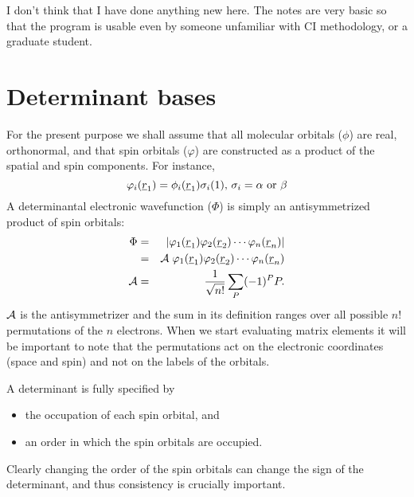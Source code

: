 I don't think that I have done anything new here.  The notes are very
basic so that the program is usable even by someone unfamiliar with CI
methodology, or a graduate student.

\section{Determinant bases}

 For the present purpose we shall assume that all molecular orbitals
($\phi$) are real, orthonormal, and that spin orbitals ($\varphi$) are
constructed as a product of the spatial and spin components.  For
instance,
\begin{equation}
 \varphi_{i}(\underline{r}_{1}) = \phi_i(\underline{r}_{1}) \sigma_i(1)
\mbox{, $\sigma_i = \alpha$ or $\beta$}
\end{equation}
A determinantal electronic wavefunction ($\Phi$) is simply an
antisymmetrized product of spin orbitals:
\begin{eqnarray}
  \Phi & = & \left| \varphi_{1}(\underline{r}_{1}) \varphi_{2}(\underline{r}_{2}) \cdots
\varphi_{n}(\underline{r}_{n}) \right | \\
       & = & {\cal A} \; \varphi_{1}(\underline{r}_{1}) \varphi_{2}(\underline{r}_{2}) \cdots
\varphi_{n}(\underline{r}_{n}) \\
{\cal A} & = & \frac{1}{\sqrt{n!}} \sum_{P} (-1)^P P.
\end{eqnarray}
${\cal A}$ is the antisymmetrizer and the sum in its definition ranges
over all possible $n!$ permutations of the $n$ electrons.  When we
start evaluating matrix elements it will be important to note that the
permutations act on the electronic coordinates (space and spin) and
not on the labels of the orbitals.  

A determinant is fully specified by
\begin{itemize}
\item the occupation of each spin orbital, and
\item an order in which the spin orbitals are occupied.
\end{itemize}
Clearly changing the order of the spin orbitals can change the sign of
the determinant, and thus consistency is crucially important. 

